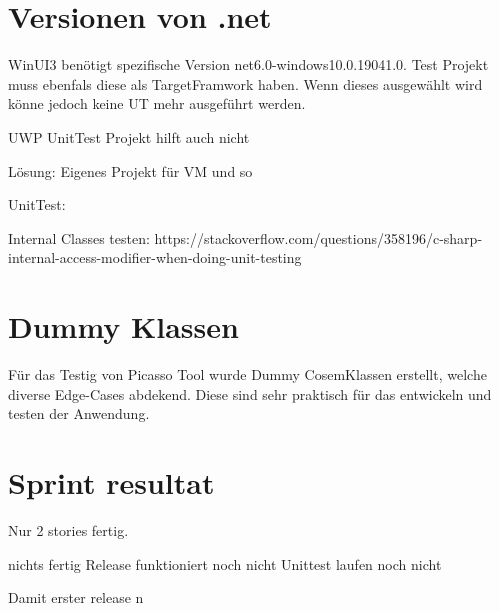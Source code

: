 \section{Versionen von .net}
WinUI3 benötigt spezifische Version net6.0-windows10.0.19041.0.
Test Projekt muss ebenfals diese als TargetFramwork haben.
Wenn dieses ausgewählt wird könne jedoch keine UT mehr ausgeführt werden.

UWP UnitTest Projekt hilft auch nicht

Lösung:
Eigenes Projekt für VM und so




UnitTest:

Internal Classes testen:
https://stackoverflow.com/questions/358196/c-sharp-internal-access-modifier-when-doing-unit-testing

\section{Dummy Klassen}
Für das Testig von Picasso Tool wurde Dummy CosemKlassen erstellt, welche diverse Edge-Cases abdekend.
Diese sind sehr praktisch für das entwickeln und testen der Anwendung.


\section{Sprint resultat}
Nur 2 stories fertig.


nichts fertig
Release funktioniert noch nicht
Unittest laufen noch nicht

Damit erster release n

